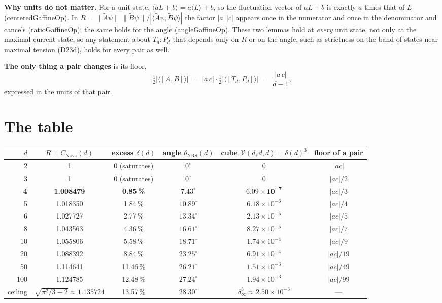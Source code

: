 \documentclass[11pt,a4paper]{article}
\newcommand{\leanus}{\textunderscore\allowbreak}
\newcommand{\lean}[1]{{\small\ttfamily\let\_\leanus #1}}
\begin{document}
\textbf{Why units do not matter.} For a unit state,
$\langle aL+b\rangle = a\langle L\rangle+b$, so the fluctuation vector of $aL+b$ is exactly
$a$ times that of $L$ (\lean{centeredG\_affineOp}). In
$R=\|\tilde A\psi\|\,\|\tilde B\psi\|/|\langle\tilde A\psi,\tilde B\psi\rangle|$ the factor
$|a|\,|c|$ appears once in the numerator and once in the denominator and cancels
(\lean{ratioG\_affineOp}); the same holds for the angle (\lean{angleG\_affineOp}). These two lemmas
hold at \emph{every} unit state, not only at the maximal current state, so any statement about $T_d{:}P_d$
that depends only on $R$ or on the angle, such as strictness on the band of states near
maximal tension (\lean{D23d}), holds for every pair as well.

\textbf{The only thing a pair changes} is its floor,
\[
  \tfrac12|\langle[A,B]\rangle| \;=\; |a\,c|\cdot\tfrac12|\langle[T_d,P_d]\rangle| \;=\; \frac{|a\,c|}{d-1},
\]
expressed in the units of that pair.

\section{The table}

\begin{center}
\small
\renewcommand{\arraystretch}{1.25}
\begin{tabular}{rccccc}
\toprule
$d$ & $R=C_{\mathrm{Nava}}(d)$ & excess $\delta(d)$ & angle $\theta_{\mathrm{NRS}}(d)$
  & cube $\mathcal V(d,d,d)=\delta(d)^3$ & floor of a pair \\
\midrule
2 & 1 & 0 (saturates) & $0^\circ$ & 0 & $|ac|$ \\
3 & 1 & 0 (saturates) & $0^\circ$ & 0 & $|ac|/2$ \\
\textbf{4} & \textbf{1.008479} & \textbf{0.85\,\%} & $\mathbf{7.43^\circ}$
  & $\mathbf{6.09\times10^{-7}}$ & $|ac|/3$ \\
5 & 1.018350 & 1.84\,\% & $10.89^\circ$ & $6.18\times10^{-6}$ & $|ac|/4$ \\
6 & 1.027727 & 2.77\,\% & $13.34^\circ$ & $2.13\times10^{-5}$ & $|ac|/5$ \\
8 & 1.043563 & 4.36\,\% & $16.61^\circ$ & $8.27\times10^{-5}$ & $|ac|/7$ \\
10 & 1.055806 & 5.58\,\% & $18.71^\circ$ & $1.74\times10^{-4}$ & $|ac|/9$ \\
20 & 1.088392 & 8.84\,\% & $23.25^\circ$ & $6.91\times10^{-4}$ & $|ac|/19$ \\
50 & 1.114641 & 11.46\,\% & $26.21^\circ$ & $1.51\times10^{-3}$ & $|ac|/49$ \\
100 & 1.124785 & 12.48\,\% & $27.24^\circ$ & $1.94\times10^{-3}$ & $|ac|/99$ \\
\midrule
ceiling & $\sqrt{\pi^2/3-2}\approx1.135724$ & 13.57\,\% & $28.30^\circ$
  & $\delta_\infty^3\approx2.50\times10^{-3}$ & --- \\
\bottomrule
\end{tabular}
\end{center}
\end{document}
